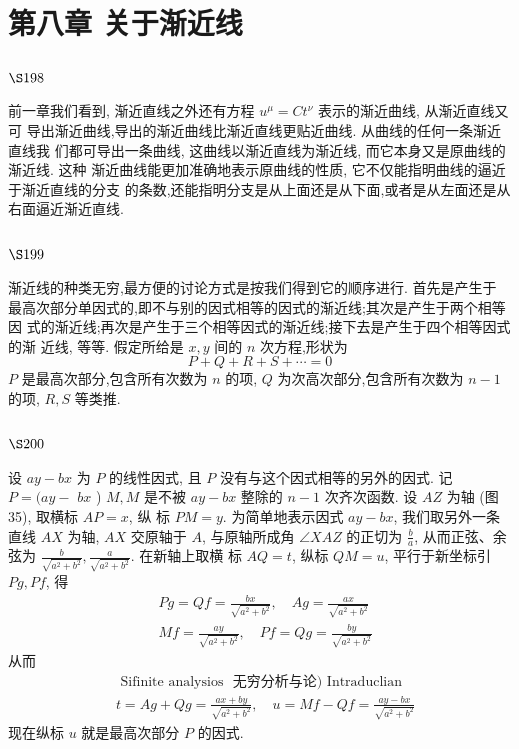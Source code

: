 \chapter{第八章 关于渐近线}

\section{$\S 198$}

前一章我们看到, 渐近直线之外还有方程 $u^{\mu}=C t^{\nu}$ 表示的渐近曲线, 从渐近直线又可 导出渐近曲线,导出的渐近曲线比渐近直线更贴近曲线. 从曲线的任何一条渐近直线我 们都可导出一条曲线, 这曲线以渐近直线为渐近线, 而它本身又是原曲线的渐近线. 这种 渐近曲线能更加准确地表示原曲线的性质, 它不仅能指明曲线的逼近于渐近直线的分支 的条数,还能指明分支是从上面还是从下面,或者是从左面还是从右面逼近渐近直线.

\section{$\S 199$}

渐近线的种类无穷,最方便的讨论方式是按我们得到它的顺序进行. 首先是产生于 最高次部分单因式的,即不与别的因式相等的因式的渐近线;其次是产生于两个相等因 式的渐近线;再次是产生于三个相等因式的渐近线;接下去是产生于四个相等因式的渐 近线, 等等. 假定所给是 $x, y$ 间的 $n$ 次方程,形状为
\[
P+Q+R+S+\cdots=0
\]
$P$ 是最高次部分,包含所有次数为 $n$ 的项, $Q$ 为次高次部分,包含所有次数为 $n-1$ 的项, $R, S$ 等类推.

\section{$\S 200$}

设 $a y-b x$ 为 $P$ 的线性因式, 且 $P$ 没有与这个因式相等的另外的因式. 记 $P=(a y-$ $b x$ ) $M, M$ 是不被 $a y-b x$ 整除的 $n-1$ 次齐次函数. 设 $A Z$ 为轴 (图 35), 取横标 $A P=x$, 纵 标 $P M=y$. 为简单地表示因式 $a y-b x$, 我们取另外一条直线 $A X$ 为轴, $A X$ 交原轴于 $A$, 与原轴所成角 $\angle X A Z$ 的正切为 $\frac{b}{a}$, 从而正弦、余弦为 $\frac{b}{\sqrt{a^{2}+b^{2}}}, \frac{a}{\sqrt{a^{2}+b^{2}}}$. 在新轴上取横 标 $A Q=t$, 纵标 $Q M=u$, 平行于新坐标引 $P g, P f$, 得
\[
\begin{aligned}
& P g=Q f=\frac{b x}{\sqrt{a^{2}+b^{2}}}, \quad A g=\frac{a x}{\sqrt{a^{2}+b^{2}}} \\
& M f=\frac{a y}{\sqrt{a^{2}+b^{2}}}, \quad P f=Q g=\frac{b y}{\sqrt{a^{2}+b^{2}}}
\end{aligned}
\]
从而 
\[
\begin{aligned}
& \text { Sifinite analysios } \text { 无穷分析与论) Intraduclian } \\
& t=A g+Q g=\frac{a x+b y}{\sqrt{a^{2}+b^{2}}}, \quad u=M f-Q f=\frac{a y-b x}{\sqrt{a^{2}+b^{2}}}
\end{aligned}
\]
现在纵标 $u$ 就是最高次部分 $P$ 的因式.



